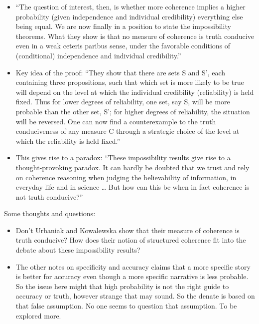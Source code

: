 \documentclass[
  11pt,
  dvipsnames,enabledeprecatedfontcommands]{scrartcl}
\begin{document}
\begin{itemize}
\item
  ``The question of interest, then, is whether more coherence implies a
  higher probability (given independence and individual credibility)
  everything else being equal. We are now finally in a position to state
  the impossibility theorems. What they show is that no measure of
  coherence is truth conducive even in a weak ceteris paribus sense,
  under the favorable conditions of (conditional) independence and
  individual credibility.''
\item
  Key idea of the proof: ``They show that there are sets S and S', each
  containing three propositions, such that which set is more likely to
  be true will depend on the level at which the individual credibility
  (reliability) is held fixed. Thus for lower degrees of reliability,
  one set, say S, will be more probable than the other set, S'; for
  higher degrees of reliability, the situation will be reversed. One can
  now find a counterexample to the truth conduciveness of any measure C
  through a strategic choice of the level at which the reliability is
  held fixed.''
\item
  This gives rise to a paradox: ``These impossibility results give rise
  to a thought-provoking paradox. It can hardly be doubted that we trust
  and rely on coherence reasoning when judging the believability of
  information, in everyday life and in science \ldots{} But how can this
  be when in fact coherence is not truth conducive?''
\end{itemize}

Some thoughts and questions:

\begin{itemize}
\item
  Don't Urbaniak and Kowalewska show that their measure of coherence is
  truth conducive? How does their notion of structured coherence fit
  into the debate about these impossibility results?
\item
  The other notes on specificity and accuracy claims that a more
  specific story is better for accuracy even though a more specific
  narrative is less probable. So the issue here might that high
  probability is not the right guide to accuracy or truth, however
  strange that may sound. So the denate is based on that false
  assumption. No one seems to question that assumption. To be explored
  more.
\end{itemize}
\end{document}
